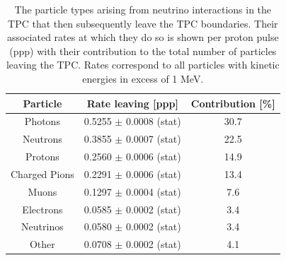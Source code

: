 \begin{table}[htbp]
\centering
\begin{tabular}{ccc}
	\hline
	 \textbf{Particle} & \textbf{Rate leaving [ppp]}& \textbf{Contribution [\%]}\\
	 \hline
	Photons & 0.5255 $\pm$ 0.0008 (stat) & 30.7 \\
	Neutrons & 0.3855 $\pm$ 0.0007 (stat) & 22.5 \\
	Protons & 0.2560 $\pm$ 0.0006 (stat) & 14.9 \\
	Charged Pions & 0.2291 $\pm$ 0.0006 (stat) & 13.4 \\
	Muons & 0.1297 $\pm$ 0.0004 (stat) & 7.6 \\
	Electrons & 0.0585 $\pm$ 0.0002 (stat) & 3.4 \\
	Neutrinos & 0.0580 $\pm$ 0.0002 (stat) & 3.4 \\
	Other & 0.0708 $\pm$ 0.0002 (stat) & 4.1\\
	\hline
\end{tabular}
\caption{The particle types arising from neutrino interactions in the TPC that then subsequently leave the TPC boundaries. Their associated rates at which they do so is shown per proton pulse (ppp) with their contribution to the total number of particles leaving the TPC. Rates correspond to all particles with kinetic energies in excess of 1 MeV.}
\label{tab:particleOutTPC}
\end{table}

